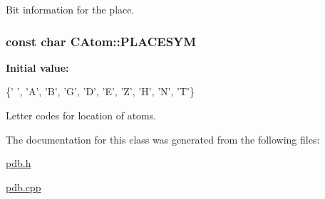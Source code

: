 Bit information for the place. 

\hypertarget{classCAtom_af438732d59641738cfea16a7dd895dea}{
\subsubsection[{P\-L\-A\-C\-E\-S\-Y\-M}]{\setlength{\rightskip}{0pt plus 5cm}const char C\-Atom\-::\-P\-L\-A\-C\-E\-S\-Y\-M\hspace{0.3cm}{\ttfamily [static]}}}\label{classCAtom_af438732d59641738cfea16a7dd895dea}
{\bfseries Initial value\-:}
\begin{DoxyCode}
 \{\textcolor{charliteral}{' '}, \textcolor{charliteral}{'A'}, \textcolor{charliteral}{'B'}, \textcolor{charliteral}{'G'}, \textcolor{charliteral}{'D'}, \textcolor{charliteral}{'E'}, 
                         \textcolor{charliteral}{'Z'}, \textcolor{charliteral}{'H'}, \textcolor{charliteral}{'N'}, \textcolor{charliteral}{'T'}\}
\end{DoxyCode}


Letter codes for location of atoms. 



The documentation for this class was generated from the following files\-:\begin{DoxyCompactItemize}
\item 
\hyperlink{pdb_8h}{pdb.\-h}\item 
\hyperlink{pdb_8cpp}{pdb.\-cpp}\end{DoxyCompactItemize}
